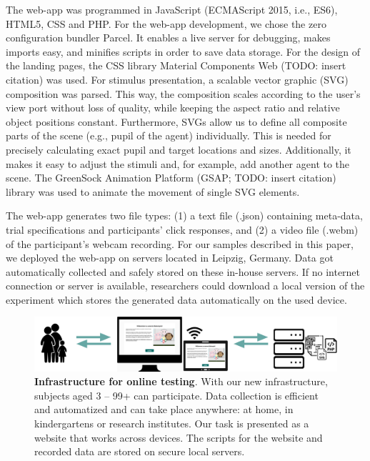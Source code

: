 \documentclass[
  english,
  man,floatsintext]{apa6}
\begin{document}
The web-app was programmed in JavaScript (ECMAScript 2015, i.e., ES6), HTML5, CSS and PHP.
For the web-app development, we chose the zero configuration bundler Parcel. It enables a live server for debugging, makes imports easy, and minifies scripts in order to save data storage.
For the design of the landing pages, the CSS library Material Components Web (TODO: insert citation) was used.
For stimulus presentation, a scalable vector graphic (SVG) composition was parsed. This way, the composition scales according to the user's view port without loss of quality, while keeping the aspect ratio and relative object positions constant.
Furthermore, SVGs allow us to define all composite parts of the scene (e.g., pupil of the agent) individually. This is needed for precisely calculating exact pupil and target locations and sizes. Additionally, it makes it easy to adjust the stimuli and, for example, add another agent to the scene.
The GreenSock Animation Platform (GSAP; TODO: insert citation) library was used to animate the movement of single SVG elements.

The web-app generates two file types: (1) a text file (.json) containing meta-data, trial specifications and participants' click responses, and (2) a video file (.webm) of the participant's webcam recording.
For our samples described in this paper, we deployed the web-app on servers located in Leipzig, Germany. Data got automatically collected and safely stored on these in-house servers. If no internet connection or server is available, researchers could download a local version of the experiment which stores the generated data automatically on the used device.



\begin{figure}

{\centering \includegraphics[width=1\linewidth]{../figures/infrastructure} 

}

\caption{\textbf{Infrastructure for online testing}. With our new infrastructure, subjects aged 3 -- 99+ can participate. Data collection is efficient and automatized and can take place anywhere: at home, in kindergartens or research institutes. Our task is presented as a website that works across devices. The scripts for the website and recorded data are stored on secure local servers.}\label{fig:fig2}
\end{figure}
\end{document}
